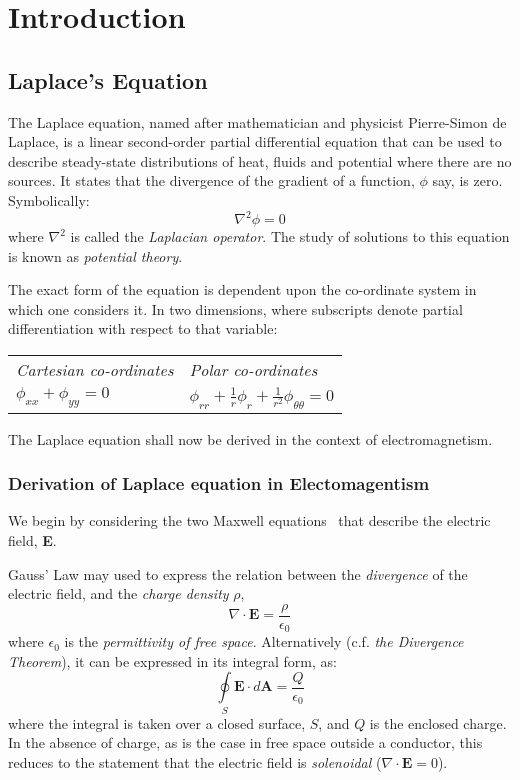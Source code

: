 \documentclass[11pt, a4paper]{article}
\newcommand{\be}{\begin{equation}}
\newcommand{\ee}{\end{equation}}
\begin{document}
\section{Introduction}
\subsection{Laplace's Equation}

The Laplace equation, named after mathematician and physicist Pierre-Simon de Laplace,
is a linear second-order partial differential equation that can be used to describe
steady-state distributions of heat, fluids and potential where there are no sources. It
states that the divergence of the gradient of a function, $\phi$ say, is zero.
Symbolically:
%
\be
\nabla ^2 \phi = 0
\ee
%
where $\nabla^2$ is called the \emph{Laplacian operator}. The study of solutions to
this equation is known as \emph{potential theory}.

The exact form of the equation is dependent upon the co-ordinate system in which one
considers it. In two dimensions, where subscripts denote partial differentiation with
respect to that variable:

\begin{center}
\begin{tabularx}{0.6\textwidth}{|Y|Y|}
\hline
\emph{Cartesian co-ordinates} & \emph{Polar co-ordinates} \\
$\phi_{xx}+\phi_{yy}=0$ & $\phi_{rr}+\frac{1}{r}\phi_r+\frac{1}{r^2}\phi_{\theta \theta}=0$ \\
\hline
\end{tabularx}
\end{center}

The Laplace equation shall now be derived in the context of electromagnetism.

\subsubsection{Derivation of Laplace equation in Electomagentism}
We begin by considering the two Maxwell equations~\cite{em} that describe the electric
field, \textbf{E}.

Gauss' Law may used to express the relation between the \emph{divergence} of the
electric field, and the \emph{charge density} $\rho$,
%
\be
\nabla \cdot \bm{E} = \frac{\rho}{\epsilon_0}
\ee
%
where $\epsilon_0$ is the \emph{permittivity of free space}. Alternatively (c.f.
\emph{the Divergence Theorem}), it can be expressed in its integral form, as:
%
\be
\oint \limits_S \bm{E} \cdot d\bm{A} = \frac{Q}{\epsilon_0}
\ee
%
where the integral is taken over a closed surface, $S$, and $Q$ is the enclosed charge.
In the absence of charge, as is the case in free space outside a conductor, this
reduces to the statement that the electric field is \emph{solenoidal}
($\nabla \cdot \bm{E}=0$).
\end{document}
